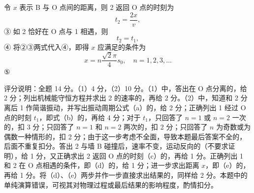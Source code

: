 \documentclass[\gkver]{gaokaozhenti}
\begin{document}
\begin{enumerate}
{令 $x$ 表示 B 与 O 点间的距离，则 2 返回 O 点的时刻为
\[ t_{2}=\frac{2x}{v}, \]③
如 2 恰好在 O 点与 1 相遇，则
\[ t_{2}=t_{1}, \]④
将②③两式代入④，即得 $x$ 应满足的条件为
\[ x=n\frac{\sqrt{2}\pi}{4}s_{0},\quad n=1,2,3,\ldots \]⑤

评分说明：全题 14 分。（1）4 分，（2）10 分。（1）中，答出在 O 点分离的，给 2 分；列出机械能守恒方程并求出 2 的速率的，再给 2 分。（2）中，知道和 2 分离后 1 作简谐振动，并写出振动周期公式（a）的，给 2 分；正确列出 1 经过 O 点的时刻 $t_{1}$，即式（b）的，再给 4 分；对于 $t_{1}$，只回答了 $n=1$ 或 $n=2$ 一次的，扣 3 分；只回答了 $n=1$ 和 $n=2$ 两次的，扣 2 分；只回答了 $n$ 为奇数或为偶数一种情形的，扣 2 分；由于这一步考虑不全面，导致本题最后答案不全的，后面不重复扣分。答出 2 与墙 B 碰撞后，速率不变，运动反向的（不要求证明），给 1 分，又正确求出 2 返回 O 点的时刻（c）的，再给 1 分。正确列出 1 和 2 在 O 点相遇的条件，即（d）的，给 1 分；进一步求出距离 $x$，即（e）的，再给 1 分。将（d）、（e）两步并作一步直接求出结果的，同样给 2 分。本题中的单纯演算错误，可视其对物理过程或最后结果的影响程度，酌情扣分。
}

\end{enumerate}
\end{document}
